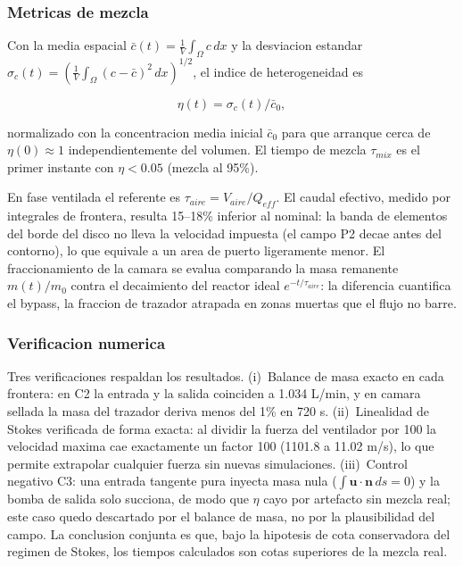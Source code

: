 \subsubsection{Metricas de mezcla}

Con la media espacial $\bar{c}(t) = \frac{1}{V}\int_\Omega c\,dx$ y la
desviacion estandar $\sigma_c(t) = \left( \frac{1}{V}\int_\Omega
(c - \bar{c})^2\,dx \right)^{1/2}$, el indice de heterogeneidad es

\begin{equation}
  \eta(t) = \sigma_c(t)/\bar{c}_0,
\end{equation}

normalizado con la concentracion media inicial $\bar{c}_0$ para que arranque
cerca de $\eta(0) \approx 1$ independientemente del volumen. El tiempo de
mezcla $\tau_{mix}$ es el primer instante con $\eta < 0.05$ (mezcla al
95\%).

En fase ventilada el referente es $\tau_{aire} = V_{aire}/Q_{eff}$. El
caudal efectivo, medido por integrales de frontera, resulta 15--18\% inferior
al nominal: la banda de elementos del borde del disco no lleva la velocidad
impuesta (el campo P2 decae antes del contorno), lo que equivale a un area
de puerto ligeramente menor. El fraccionamiento de la camara se evalua
comparando la masa remanente $m(t)/m_0$ contra el decaimiento del reactor
ideal $e^{-t/\tau_{aire}}$: la diferencia cuantifica el bypass, la fraccion
de trazador atrapada en zonas muertas que el flujo no barre.

\subsubsection{Verificacion numerica}

Tres verificaciones respaldan los resultados. (i)~Balance de masa exacto en
cada frontera: en C2 la entrada y la salida coinciden a 1.034 L/min, y en
camara sellada la masa del trazador deriva menos del 1\% en 720 s.
(ii)~Linealidad de Stokes verificada de forma exacta: al dividir la fuerza
del ventilador por 100 la velocidad maxima cae exactamente un factor 100
(1101.8 a 11.02 m/s), lo que permite extrapolar cualquier fuerza sin nuevas
simulaciones. (iii)~Control negativo C3: una entrada tangente pura inyecta
masa nula ($\int \mathbf{u}\cdot\mathbf{n}\,ds = 0$) y la bomba de salida
solo succiona, de modo que $\eta$ cayo por artefacto sin mezcla real; este
caso quedo descartado por el balance de masa, no por la plausibilidad del
campo. La conclusion conjunta es que, bajo la hipotesis de cota
conservadora del regimen de Stokes, los tiempos calculados son cotas
superiores de la mezcla real.

